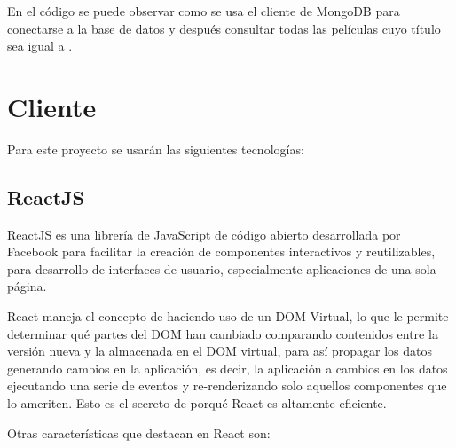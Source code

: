 En el código se puede observar como se usa el cliente de MongoDB para conectarse a la base de datos  y después consultar todas las películas cuyo título sea igual a .

\section{Cliente}

Para este proyecto se usarán las siguientes tecnologías:

\subsection{ReactJS}

ReactJS es una librería de JavaScript de código abierto desarrollada por Facebook para facilitar la creación de componentes interactivos y reutilizables, para desarrollo de interfaces de usuario, especialmente aplicaciones de una sola página.

React maneja el concepto de  \cite{ReactiveProgramming} haciendo uso de un DOM Virtual, lo que le permite determinar qué partes del DOM han cambiado comparando contenidos entre la versión nueva y la almacenada en el DOM virtual, para así propagar los datos generando cambios en la aplicación, es decir, la aplicación  a cambios en los datos ejecutando una serie de eventos y re-renderizando solo aquellos componentes que lo ameriten. Esto es el secreto de porqué React es altamente eficiente.

Otras características que destacan en React son:

